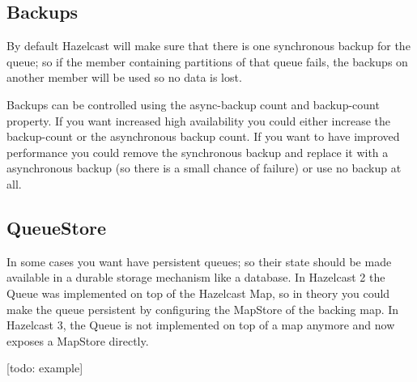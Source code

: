 \subsection{Backups}
By default Hazelcast will make sure that there is one synchronous backup for the queue; so if the member containing partitions of that queue fails, the backups on another member will be used so no data is lost.

Backups can be controlled using the async-backup count and backup-count property. If you want increased high availability you could either increase the backup-count or the asynchronous backup count. If you want to have improved performance you could remove the synchronous backup and replace it with a asynchronous backup (so there is a small chance of failure) or use no backup at all.

\subsection{QueueStore}
In some cases you want have persistent queues; so their state should be made available in a durable storage mechanism like a database. In Hazelcast 2 the Queue was implemented on top of the Hazelcast Map, so in theory you could make the queue persistent by configuring the MapStore of the backing map. In Hazelcast 3, the Queue is not implemented on top of a map anymore and now exposes a MapStore directly.

[todo: example]

